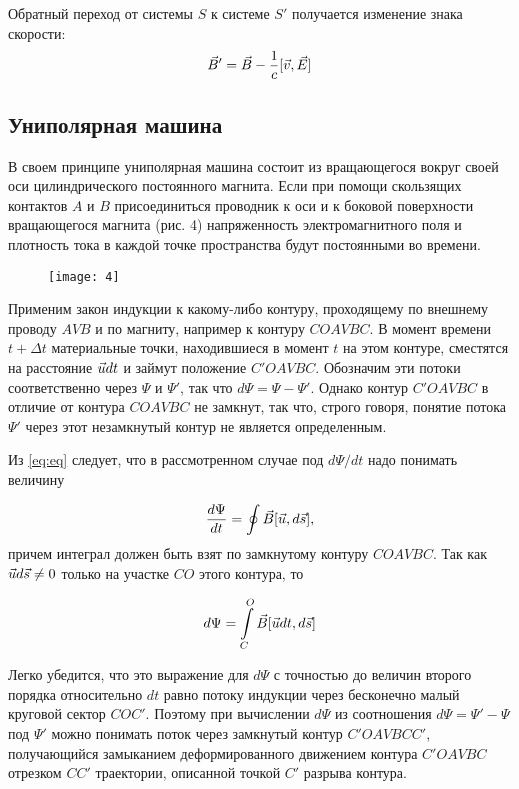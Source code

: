 Обратный переход от системы $S$ к
системе $S'$ получается изменение знака
скорости:
\begin{equation}
    \vec{B}' = \vec{B} - \frac{1}{c}
    [\vec{v}, \vec{E}]
    \label{eq:B'}
\end{equation}

\subsection{Униполярная машина}
В своем принципе униполярная машина
состоит из вращающегося вокруг своей оси
цилиндрического постоянного магнита.
Если при помощи скользящих контактов $A$
и $B$ присоединиться проводник к оси и к
боковой поверхности вращающегося магнита
(рис. 4)
напряженность электромагнитного поля и
плотность тока в каждой точке
пространства будут постоянными во
времени. 

\begin{wrapfigure}[11]{l}{0.2\linewidth}
    \texttt{[image: 4]}
    \captionsetup{justification=centering}
    \caption{}
\end{wrapfigure}

Применим закон индукции к какому-либо
контуру, проходящему по внешнему проводу
$AVB$ и по магниту, например к контуру
$COAVBC$. В момент времени $t+\Delta t$
материальные точки, находившиеся в
момент $t$ на этом контуре, сместятся на
расстояние $\vec{u}dt$ и займут положение
$C'OAVBC$. Обозначим эти потоки
соответственно через $\Psi$ и $\Psi'$,
так что $d\Psi = \Psi - \Psi'$. Однако
контур $C'OAVBC$ в отличие от контура
$COAVBC$ не замкнут, так что, строго
говоря, понятие потока $\Psi'$ через
этот незамкнутый контур не является
определенным.

Из \eqref{eq:eq} следует, что в
рассмотренном случае под $d\Psi/dt$ надо
понимать величину 

\[
    \frac{d\Psi}{dt} = \oint
    \vec{B}[\vec{u}, d\vec{s}],
\]
причем интеграл должен быть взят по
замкнутому контуру $COAVBC$. Так как
$\vec{u} d\vec{s} \neq 0$ только на
участке $CO$ этого контура, то

\[
    d\Psi = \int\limits_C^O
    \vec{B}[\vec{u}dt, d\vec{s}]
\]

Легко убедится, что это выражение для
$d\Psi$ с точностью до величин второго
порядка относительно $dt$ равно потоку
индукции через бесконечно малый круговой
сектор $COC'$. Поэтому при вычислении
$d\Psi$ из соотношения $d\Psi = \Psi' -
\Psi$ под $\Psi'$ можно понимать поток
через замкнутый контур $C'OAVBCC'$,
получающийся замыканием деформированного
движением контура $C'OAVBC$ отрезком
$CC'$ траектории, описанной точкой $C'$
разрыва контура. 

